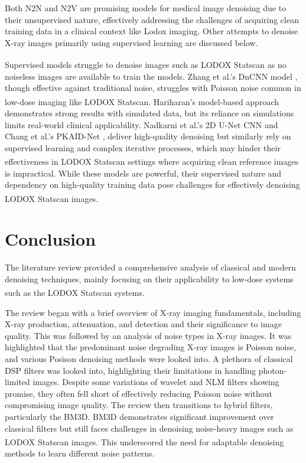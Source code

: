 \newpage
Both \gls{N2N} and \gls{N2V} are promising models for medical image denoising due to their unsupervised nature, effectively addressing the challenges of acquiring clean training data in a clinical context like Lodox imaging. Other attempts to denoise X-ray images primarily using supervised learning are discussed below.

Supervised models struggle to denoise images such as LODOX\textsuperscript{\textregistered} Statscan\textsuperscript{\textregistered} as no noiseless images are available to train the models. Zhang et al.'s \gls{DnCNN} model \cite{7839189}, though effective against traditional noise, struggles with Poisson noise common in low-dose imaging like LODOX\textsuperscript{\textregistered} Statscan\textsuperscript{\textregistered}. Hariharan's model-based approach \cite{hariharan_learning-based_2019} demonstrates strong results with simulated data, but its reliance on simulations limits real-world clinical applicability. Nadkarni et al.'s 2D \gls{U-Net} \gls{CNN} \cite{huber_dedicated_2022} and Chang et al.'s \gls{PKAID-Net} \cite{chang_improved_2024}, deliver high-quality denoising but similarly rely on supervised learning and complex iterative processes, which may hinder their effectiveness in LODOX\textsuperscript{\textregistered} Statscan\textsuperscript{\textregistered} settings where acquiring clean reference images is impractical. While these models are powerful, their supervised nature and dependency on high-quality training data pose challenges for effectively denoising LODOX\textsuperscript{\textregistered} Statscan\textsuperscript{\textregistered} images. 


\section{Conclusion}
The literature review provided a comprehensive analysis of classical and modern denoising techniques, mainly focusing on their applicability to low-dose systems such as the LODOX\textsuperscript{\textregistered} Statscan\textsuperscript{\textregistered} systems. 

The review began with a brief overview of X-ray imaging fundamentals, including X-ray production, attenuation, and detection and their significance to image quality. This was followed by an analysis of noise types in X-ray images. It was highlighted that the predominant noise degrading X-ray images is Poisson noise, and various Posison denoising methods were looked into. A plethora of classical \gls{DSP} filters was looked into, highlighting their limitations in handling photon-limited images. Despite some variations of wavelet and \gls{NLM} filters showing promise, they often fell short of effectively reducing Poisson noise without compromising image quality. The review then transitions to hybrid filters, particularly the \gls{BM3D}. \gls{BM3D} demonstrates significant improvement over classical filters but still faces challenges in denoising noise-heavy images such as LODOX\textsuperscript{\textregistered} Statscan\textsuperscript{\textregistered} images. This underscored the need for adaptable denoising methods to learn different noise patterns.

